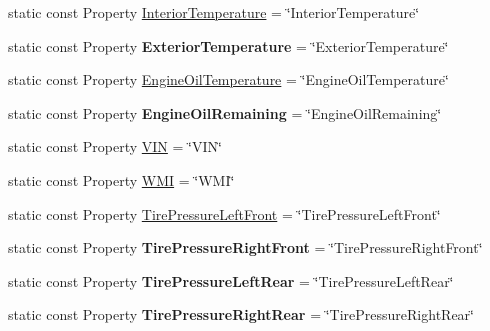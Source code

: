 \begin{DoxyCompactItemize}
\item 
static const Property \hyperlink{classVehicleProperty_adbbb68033f8531903ff3e3024864eef3}{Interior\-Temperature} = \char`\"{}Interior\-Temperature\char`\"{}
\item 
\hypertarget{classVehicleProperty_ad9510186dc9ef236b59743371f093d36}{static const Property {\bfseries Exterior\-Temperature} = \char`\"{}Exterior\-Temperature\char`\"{}}\label{classVehicleProperty_ad9510186dc9ef236b59743371f093d36}

\item 
static const Property \hyperlink{classVehicleProperty_a9d4a610d94b12f139ea00b271804a73f}{Engine\-Oil\-Temperature} = \char`\"{}Engine\-Oil\-Temperature\char`\"{}
\item 
\hypertarget{classVehicleProperty_aeeece192dedcd20cb112dea6905aa80c}{static const Property {\bfseries Engine\-Oil\-Remaining} = \char`\"{}Engine\-Oil\-Remaining\char`\"{}}\label{classVehicleProperty_aeeece192dedcd20cb112dea6905aa80c}

\item 
static const Property \hyperlink{classVehicleProperty_ae72c1c7de185f330862c62dfb9d93a34}{V\-I\-N} = \char`\"{}V\-I\-N\char`\"{}
\item 
static const Property \hyperlink{classVehicleProperty_a32f980d900d97cf94171ea9fa25408e0}{W\-M\-I} = \char`\"{}W\-M\-I\char`\"{}
\item 
static const Property \hyperlink{classVehicleProperty_ac9231c21753a535525d8526889f7a998}{Tire\-Pressure\-Left\-Front} = \char`\"{}Tire\-Pressure\-Left\-Front\char`\"{}
\item 
\hypertarget{classVehicleProperty_ad11bf5a2d63d1b934ab6b33a9f351824}{static const Property {\bfseries Tire\-Pressure\-Right\-Front} = \char`\"{}Tire\-Pressure\-Right\-Front\char`\"{}}\label{classVehicleProperty_ad11bf5a2d63d1b934ab6b33a9f351824}

\item 
\hypertarget{classVehicleProperty_af10c5b8637f549de87ae9da4e0188cf7}{static const Property {\bfseries Tire\-Pressure\-Left\-Rear} = \char`\"{}Tire\-Pressure\-Left\-Rear\char`\"{}}\label{classVehicleProperty_af10c5b8637f549de87ae9da4e0188cf7}

\item 
\hypertarget{classVehicleProperty_aa8f728b02a1ba3e12b28fdde64f4ddf0}{static const Property {\bfseries Tire\-Pressure\-Right\-Rear} = \char`\"{}Tire\-Pressure\-Right\-Rear\char`\"{}}\label{classVehicleProperty_aa8f728b02a1ba3e12b28fdde64f4ddf0}


\end{DoxyCompactItemize}
